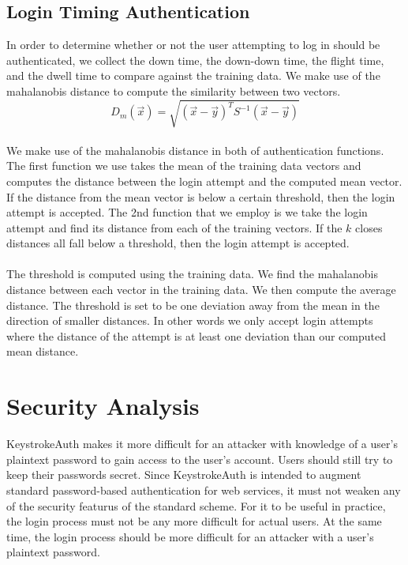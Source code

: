 \documentclass{article}
\begin{document}
\subsection{Login Timing Authentication}
In order to determine whether or not the user attempting to log in should be authenticated, we collect the down time, the down-down time, the flight time, and the dwell time to compare against the training data. We make use of the mahalanobis distance to compute the similarity between two vectors.  \\
\begin{displaymath}
D_m(\vec{x}) = \sqrt{(\vec{x}-\vec{y})^T S^{-1} (\vec{x}-\vec{y})}
\end{displaymath} \\
We make use of the mahalanobis distance in both of authentication functions. The first function we use takes the mean of the training data vectors and computes the distance between the login attempt and the computed mean vector. If the distance from the mean vector is below a certain threshold, then the login attempt is accepted. The 2nd function that we employ is we take the login attempt and find its distance from each of the training vectors. If the $k$ closes distances all fall below a threshold, then the login attempt is accepted. \\ \\
The threshold is computed using the training data. We find the mahalanobis distance between each vector in the training data. We then compute the average distance. The threshold is set to be one deviation away from the mean in the direction of smaller distances. In other words we only accept login attempts where the distance of the attempt is at least one deviation than our computed mean distance. 
\section{Security Analysis}
KeystrokeAuth makes it more difficult for an attacker with knowledge of a user's plaintext password to gain access to the user's account.
Users should still try to keep their passwords secret.
Since KeystrokeAuth is intended to augment standard password-based authentication for web services, it must not weaken any of the security featurus of the standard scheme. 
For it to be useful in practice, the login process must not be any more difficult for actual users.
At the same time, the login process should be more difficult for an attacker with a user's plaintext password.
\end{document}
